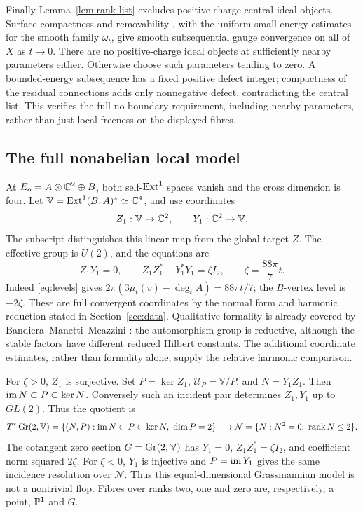 Finally Lemma~\ref{lem:rank-list} excludes positive-charge central
ideal objects. Surface compactness and removability
\cite[Section~3.1]{gstw}, with the uniform small-energy estimates
for the smooth family \(\omega_t\), give smooth subsequential
gauge convergence on all of \(X\) as \(t\to0\).
There are no positive-charge ideal objects at sufficiently nearby
parameters either. Otherwise choose such parameters tending to
zero. A bounded-energy subsequence has a fixed positive defect
integer; compactness of the residual connections adds only
nonnegative defect, contradicting the central list.
This verifies the full no-boundary requirement, including nearby
parameters, rather than just local freeness on the displayed fibres.

\subsection{The full nonabelian local model}\label{subsec:grass-model}
At \(E_o=A\otimes\mathbb C^2\oplus B\), both self-\(\operatorname{Ext}^1\) spaces
vanish and the cross dimension is four.
Let \(\mathbb V=\operatorname{Ext}^1(B,A)^*\simeq\mathbb C^4\), and use coordinates
\[
 Z_1:\mathbb V\to\mathbb C^2,\qquad Y_1:\mathbb C^2\to\mathbb V.
\]
The subscript distinguishes this linear map from the global
target \(Z\). The effective group is \(U(2)\), and the equations are
\begin{equation}\label{eq:u2-model}
 Z_1Y_1=0,\qquad Z_1Z_1^*-Y_1^*Y_1=\zeta I_2,\qquad
 \zeta=\frac{88\pi}{7}t .
\end{equation}
Indeed \eqref{eq:levels} gives
\(2\pi(3\mu_t(v)-\deg_t A)=88\pi t/7\);
the \(B\)-vertex level is \(-2\zeta\).
These are full convergent coordinates by the normal form and
harmonic reduction stated in Section~\ref{sec:data}.
Qualitative formality is already covered by
Bandiera--Manetti--Meazzini \cite[Theorem~5.1]{bmm}: the
automorphism group is reductive, although the stable factors
have different reduced Hilbert constants.
The additional coordinate estimates, rather than formality
alone, supply the relative harmonic comparison.

For \(\zeta>0\), \(Z_1\) is surjective. Set \(P=\ker Z_1\),
\(\mathcal U_P=\mathbb V/P\), and \(N=Y_1Z_1\).
Then \(\operatorname{im} N\subset P\subset\ker N\).
Conversely such an incident pair determines \(Z_1,Y_1\)
up to \(GL(2)\). Thus the quotient is
\begin{equation}\label{eq:incidence}
 T^*\operatorname{Gr}(2,\mathbb V)=
 \{(N,P):\operatorname{im} N\subset P\subset\ker N,\ \dim P=2\}
 \longrightarrow
 \mathcal N=\{N:N^2=0,\ \operatorname{rank} N\le2\}.
\end{equation}
The cotangent zero section \(G=\operatorname{Gr}(2,\mathbb V)\) has
\(Y_1=0\), \(Z_1Z_1^*=\zeta I_2\), and coefficient norm
squared \(2\zeta\).
For \(\zeta<0\), \(Y_1\) is injective and \(P=\operatorname{im} Y_1\)
gives the same incidence resolution over \(\mathcal N\).
Thus this equal-dimensional Grassmannian model is not a
nontrivial flop. Fibres over ranks two, one and zero are,
respectively, a point, \(\mathbb P^1\) and \(G\).

